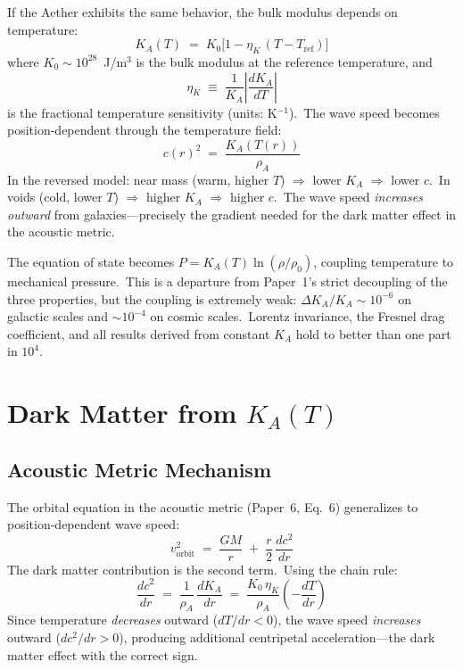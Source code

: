 \documentclass[12pt,letterpaper]{article}
\newcommand{\rhoa}{\rho_{\!A}}
\newcommand{\Ka}{K_{\!A}}
\newcommand{\etaK}{\eta_{\!K}}
\begin{document}
If the Aether exhibits the same behavior, the bulk modulus depends on
temperature:
%
\begin{equation}
  \Ka(T) \;=\; K_0\bigl[1 - \etaK\,(T - T_{\mathrm{ref}})\bigr]
  \label{eq:KA-T}
\end{equation}
%
where $K_0 \sim 10^{28}$~J/m$^3$ is the bulk modulus at the reference
temperature, and
%
\begin{equation}
  \etaK \;\equiv\; \frac{1}{\Ka}\left|\frac{d\Ka}{dT}\right|
  \label{eq:eta-def}
\end{equation}
%
is the fractional temperature sensitivity (units: K$^{-1}$).\ The wave speed
becomes position-dependent through the temperature field:
%
\begin{equation}
  c(r)^2 \;=\; \frac{\Ka(T(r))}{\rhoa}
  \label{eq:c-of-r}
\end{equation}
%
In the reversed model: near mass (warm, higher $T$) $\Rightarrow$ lower $\Ka$
$\Rightarrow$ lower $c$.\ In voids (cold, lower $T$) $\Rightarrow$ higher
$\Ka$ $\Rightarrow$ higher $c$.\ The wave speed \emph{increases outward} from
galaxies---precisely the gradient needed for the dark matter effect in the
acoustic metric.

The equation of state becomes $P = \Ka(T)\ln(\rho/\rho_0)$, coupling
temperature to mechanical pressure.\ This is a departure from Paper~1's
strict decoupling of the three properties, but the coupling is extremely
weak: $\Delta\Ka/\Ka \sim 10^{-6}$ on galactic scales and $\sim$$10^{-4}$
on cosmic scales.\ Lorentz invariance, the Fresnel drag coefficient, and all
results derived from constant $\Ka$ hold to better than one part in $10^4$.


\section{Dark Matter from \texorpdfstring{$\Ka(T)$}{K\_A(T)}}
\label{sec:dark-matter}

\subsection{Acoustic Metric Mechanism}

The orbital equation in the acoustic metric (Paper~6, Eq.~6) generalizes
to position-dependent wave speed:
%
\begin{equation}
  v_{\mathrm{orbit}}^2 \;=\; \frac{GM}{r}
    \;+\; \frac{r}{2}\,\frac{dc^2}{dr}
  \label{eq:vorbit}
\end{equation}
%
The dark matter contribution is the second term.\ Using the chain rule:
%
\begin{equation}
  \frac{dc^2}{dr} \;=\; \frac{1}{\rhoa}\,\frac{d\Ka}{dr}
    \;=\; \frac{K_0\,\etaK}{\rhoa}\left(-\frac{dT}{dr}\right)
  \label{eq:dc2dr}
\end{equation}
%
Since temperature \emph{decreases} outward ($dT/dr < 0$), the wave speed
\emph{increases} outward ($dc^2/dr > 0$), producing additional centripetal
acceleration---the dark matter effect with the correct sign.
\end{document}
